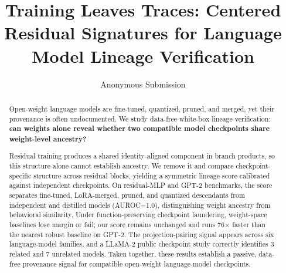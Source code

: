 \documentclass[11pt]{article}
\title{Training Leaves Traces: Centered Residual Signatures for Language Model Lineage Verification}
\author{Anonymous Submission}
\begin{document}
\maketitle

\begin{abstract}
Open-weight language models are fine-tuned, quantized, pruned, and merged, yet their provenance is often undocumented. We study data-free white-box lineage verification: \textbf{can weights alone reveal whether two compatible model checkpoints share weight-level ancestry?}

Residual training produces a shared identity-aligned component in branch products, so this structure alone cannot establish ancestry. We remove it and compare checkpoint-specific structure across residual blocks, yielding a symmetric lineage score calibrated against independent checkpoints. On residual-MLP and GPT-2 benchmarks, the score separates fine-tuned, LoRA-merged, pruned, and quantized descendants from independent and distilled models (AUROC=1.0), distinguishing weight ancestry from behavioral similarity. Under function-preserving checkpoint laundering, weight-space baselines lose margin or fail; our score remains unchanged and runs 76$\times$ faster than the nearest robust baseline on GPT-2. The projection-pairing signal appears across six language-model families, and a LLaMA-2 public checkpoint study correctly identifies 3 related and 7 unrelated models. Taken together, these results establish a passive, data-free provenance signal for compatible open-weight language-model checkpoints.
\end{abstract}









\appendix

\end{document}
